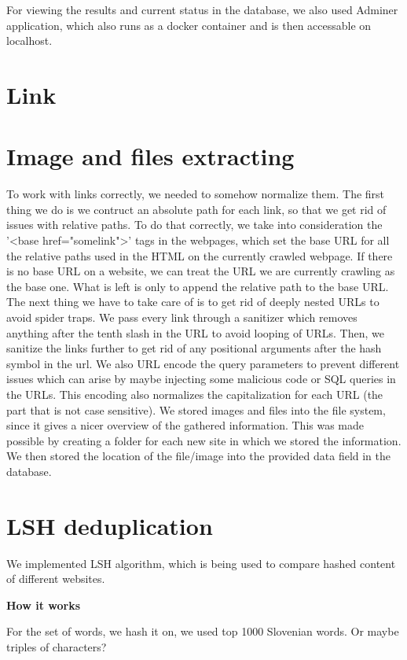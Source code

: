 \documentclass[9pt]{IEEEtran}
\begin{document}
For viewing the results and current status in the database, we also used Adminer application, which also runs as a docker container and is then accessable on localhost.


\section{Link}


\section{Image and files extracting}
To work with links correctly, we needed to somehow normalize them.
The first thing we do is we contruct an absolute path for each link, so that we get rid of issues with relative paths.
To do that correctly, we take into consideration the '<base href="somelink">' tags in the webpages, which set the base URL for all the relative paths used in the HTML on the currently crawled webpage.
If there is no base URL on a website, we can treat the URL we are currently crawling as the base one.
What is left is only to append the relative path to the base URL.
The next thing we have to take care of is to get rid of deeply nested URLs to avoid spider traps.
We pass every link through a sanitizer which removes anything after the tenth slash in the URL to avoid looping of URLs.
Then, we sanitize the links further to get rid of any positional arguments after the hash symbol in the url.
We also URL encode the query parameters to prevent different issues which can arise by maybe injecting some malicious code or SQL queries in the URLs.
This encoding also normalizes the capitalization for each URL (the part that is not case sensitive).
We stored images and files into the file system, since it gives a nicer overview of the gathered information. This was made possible by creating a folder for each new site in which we stored the information. We then stored the location of the file/image into the provided data field in the database.




\section{LSH deduplication}
We implemented LSH algorithm, which is being used to compare hashed content of different websites. 

\textbf{How it works}

For the set of words, we hash it on, we used top 1000 Slovenian words. Or maybe triples of characters?
\end{document}
